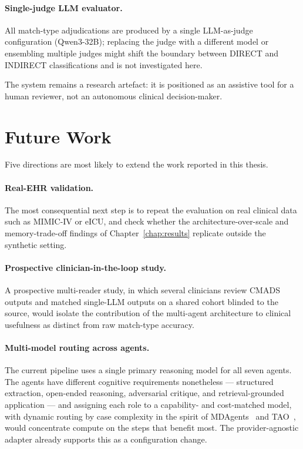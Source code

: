 \paragraph{Single-judge LLM evaluator.}
All match-type adjudications are produced by a single LLM-as-judge
configuration (Qwen3-32B); replacing the judge with a different model or
ensembling multiple judges might shift the boundary between DIRECT and
INDIRECT classifications and is not investigated here.

The system remains a research artefact: it is positioned as an
assistive tool for a human reviewer, not an autonomous clinical
decision-maker.

\section{Future Work}
\label{sec:concl_future}

Five directions are most likely to extend the work reported in this
thesis.

\paragraph{Real-EHR validation.}
The most consequential next step is to repeat the evaluation on real
clinical data such as MIMIC-IV or eICU, and check whether the
architecture-over-scale and memory-trade-off findings of
Chapter~\ref{chap:results} replicate outside the synthetic setting.

\paragraph{Prospective clinician-in-the-loop study.}
A prospective multi-reader study, in which several clinicians review
CMADS outputs and matched single-LLM outputs on a shared cohort
blinded to the source, would isolate the contribution of the
multi-agent architecture to clinical usefulness as distinct from raw
match-type accuracy.

\paragraph{Multi-model routing across agents.}
The current pipeline uses a single primary reasoning model for all
seven agents. The agents have different cognitive requirements
nonetheless --- structured extraction, open-ended reasoning,
adversarial critique, and retrieval-grounded application --- and
assigning each role to a capability- and cost-matched model, with
dynamic routing by case complexity in the spirit of
MDAgents~\cite{Kim2024MDAgents} and TAO~\cite{Kim2025TAO}, would
concentrate compute on the steps that benefit most. The
provider-agnostic adapter already supports this as a configuration
change.

